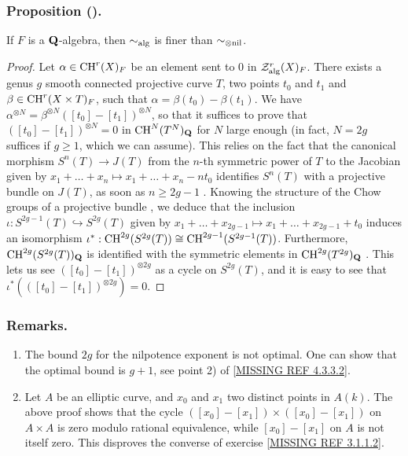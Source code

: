 \documentclass[../main.tex]{subfiles}
\begin{document}
\subsubsection{Proposition (\cite{voevodsky95}).} If $F$ is a $\mathbf{Q}$-algebra, then $\sim_{\mathrm{alg}}$ is finer than $\sim_{\otimes\mathrm{nil}}$.
\begin{proof}
Let $\alpha \in \operatorname{CH}^r(X)_F$ be an element sent to $0$ in $\mathcal{Z}^r_{\mathrm{alg}}(X)_F$.
There exists a genus $g$ smooth connected projective curve $T$, two points $t_0$ and $t_1$ and $\beta \in \operatorname{CH}^r(X \times T)_F$, such that $\alpha = \beta(t_0) - \beta(t_1)$.
We have $\alpha^{\otimes N} = \beta^{\otimes N}([t_0] - [t_1])^{\otimes N}$, so that it suffices to prove that $([t_0] - [t_1])^{\otimes N} = 0$ in $\operatorname{CH}^N(T^N)_{\mathbf{Q}}$ for $N$ large enough (in fact, $N = 2g$ suffices if $g \geq 1$, which we can assume).
This relies on the fact that the canonical morphism $S^n(T) \to J(T)$ from the $n$-th symmetric power of $T$ to the Jacobian given by $x_1 + \dots + x_n \mapsto x_1 + \dots + x_n - nt_0$ identifies $S^n(T)$ with a projective bundle on $J(T)$, as soon as $n \geq 2g - 1$ \cite{col75}.
Knowing the structure of the Chow groups of a projective bundle \cite{fu84}, we deduce that the inclusion $\iota : S^{2g - 1}(T) \hookrightarrow S^{2g}(T)$ given by $x_1 + \dots + x_{2g - 1} \mapsto x_1 + \dots + x_{2g - 1} + t_0$ induces an isomorphism $\iota^* : \operatorname{CH}^{2g}(S^{2g}(T)) \cong \operatorname{CH}^{2g-1}(S^{2g-1}(T))$.
Furthermore, $\operatorname{CH}^{2g}(S^{2g}(T))_{\mathbf{Q}}$ is identified with the symmetric elements in $\operatorname{CH}^{2g}(T^{2g})_{\mathbf{Q}}$ \cite{fu84}.
This lets us see $([t_0] - [t_1])^{\otimes 2g}$ as a cycle on $S^{2g}(T)$, and it is easy to see that $\iota^*(([t_0] - [t_1])^{\otimes 2g}) = 0$.
\end{proof}

\subsubsection{Remarks.}
\begin{enumerate}[label=\arabic*)]
    \item The bound $2g$ for the nilpotence exponent is not optimal. One can show that the optimal bound is $g + 1$, see point 2) of \ref{MISSING REF 4.3.3.2}.
    \item Let $A$ be an elliptic curve, and $x_0$ and $x_1$ two distinct points in $A(k)$.
    The above proof shows that the cycle $([x_0] - [x_1]) \times ([x_0] - [x_1])$ on $A \times A$ is zero modulo rational equivalence, while $[x_0] - [x_1]$ on $A$ is not itself zero.
    This disproves the converse of exercise \ref{MISSING REF 3.1.1.2}.
\end{enumerate}
\end{document}
